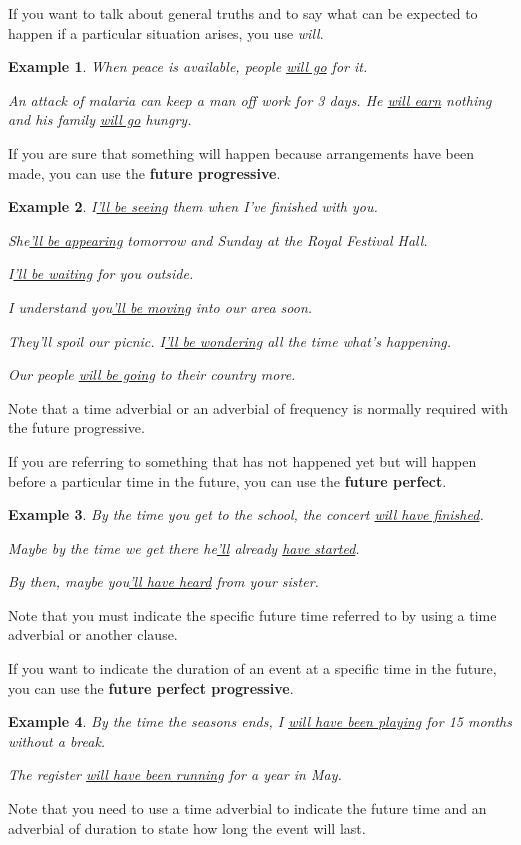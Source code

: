 \documentclass[oneside]{book}
\numberwithin{equation}{section}
\newtheorem{example}{Example}[section]
\begin{document}
%
\noindent{} If you want to talk about general truths and to say what can be expected to happen if a particular situation arises, you use \textit{will}.
\begin{example}
    When peace is available, people \underline{will go} for it.
    
    An attack of malaria can keep a man off work for 3 days. He \underline{will earn} nothing and his family \underline{will go} hungry.
\end{example}
%
\noindent{} If you are sure that something will happen because arrangements have been made, you can use the \textbf{future progressive}.
\begin{example}
    I\underline{'ll be seeing} them when I've finished with you.
    
    She\underline{'ll be appearing} tomorrow and Sunday at the Royal Festival Hall.
    
    I\underline{'ll be waiting} for you outside.
    
    I understand you\underline{'ll be moving} into our area soon.
    
    They'll spoil our picnic. I\underline{'ll be wondering} all the time what's happening.
    
    Our people \underline{will be going} to their country more.
\end{example}
Note that a time adverbial or an adverbial of frequency is normally required with the future progressive.

%
\noindent{} If you are referring to something that has not happened yet but will happen before a particular time in the future, you can use the \textbf{future perfect}.
\begin{example}
    By the time you get to the school, the concert \underline{will have finished}.
    
    Maybe by the time we get there he\underline{'ll} already \underline{have started}.
    
    By then, maybe you\underline{'ll have heard} from your sister.
\end{example}
Note that you must indicate the specific future time referred to by using a time adverbial or another clause.

%
\noindent{} If you want to indicate the duration of an event at a specific time in the future, you can use the \textbf{future perfect progressive}.
\begin{example}
    By the time the seasons ends, I \underline{will have been playing} for 15 months without a break.
    
    The register \underline{will have been running} for a year in May.
\end{example}
Note that you need to use a time adverbial to indicate the future time and an adverbial of duration to state how long the event will last.
\end{document}
